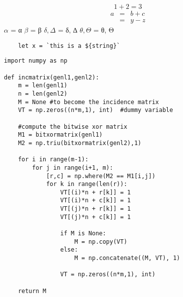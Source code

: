 \documentclass[a4paper,12pt]{article}
\begin{document}
\begin{equation}1+2=3\end{equation}
\begin{eqnarray}
  a & = & b + c \\
    & = & y - z
\end{eqnarray}
$\alpha$ = α
$\beta$ = β
$\delta, \Delta$ = δ, ∆
$\theta, \Theta$ = θ, Θ

\begin{comment}
This is a comment.
\end{comment}


\lstset{language=JavaScript}
\begin{lstlisting}
    let x = `this is a ${string}`
\end{lstlisting}

\begin{verbatim}
import numpy as np
 
def incmatrix(genl1,genl2):
    m = len(genl1)
    n = len(genl2)
    M = None #to become the incidence matrix
    VT = np.zeros((n*m,1), int)  #dummy variable
 
    #compute the bitwise xor matrix
    M1 = bitxormatrix(genl1)
    M2 = np.triu(bitxormatrix(genl2),1) 
 
    for i in range(m-1):
        for j in range(i+1, m):
            [r,c] = np.where(M2 == M1[i,j])
            for k in range(len(r)):
                VT[(i)*n + r[k]] = 1
                VT[(i)*n + c[k]] = 1
                VT[(j)*n + r[k]] = 1
                VT[(j)*n + c[k]] = 1
 
                if M is None:
                    M = np.copy(VT)
                else:
                    M = np.concatenate((M, VT), 1)
 
                VT = np.zeros((n*m,1), int)
 
    return M
\end{verbatim}

\end{document}
